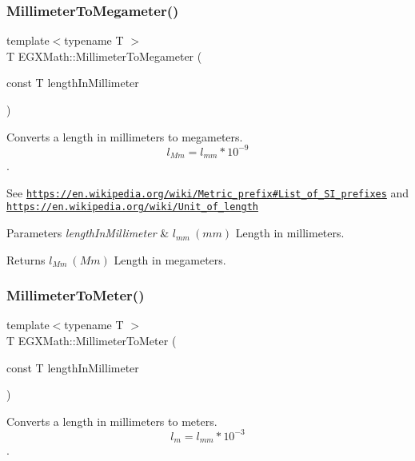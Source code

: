 \subsubsection{\texorpdfstring{Millimeter\+To\+Megameter()}{MillimeterToMegameter()}}
{\footnotesize\ttfamily template$<$typename T $>$ \\
T E\+G\+X\+Math\+::\+Millimeter\+To\+Megameter (\begin{DoxyParamCaption}\item[{const T}]{length\+In\+Millimeter }\end{DoxyParamCaption})}



Converts a length in millimeters to megameters. \[ l_{Mm}=l_{mm} * 10^{-9} \]. 

See \href{https://en.wikipedia.org/wiki/Metric_prefix#List_of_SI_prefixes}{\tt https\+://en.\+wikipedia.\+org/wiki/\+Metric\+\_\+prefix\#\+List\+\_\+of\+\_\+\+S\+I\+\_\+prefixes} and \href{https://en.wikipedia.org/wiki/Unit_of_length}{\tt https\+://en.\+wikipedia.\+org/wiki/\+Unit\+\_\+of\+\_\+length} 
\begin{DoxyParams}{Parameters}
{\em length\+In\+Millimeter} & $ l_{mm}\ (mm)$ Length in millimeters. \\
\hline
\end{DoxyParams}
\begin{DoxyReturn}{Returns}
$ l_{Mm}\ (Mm)$ Length in megameters. 
\end{DoxyReturn}
\mbox{\label{group___e_g_x_math-_conversions-_length_conversions-_s_i-_millimeter-_s_i_ga5bf52177bcfa3cce836b7cec4dcf5fb5}} 
\subsubsection{\texorpdfstring{Millimeter\+To\+Meter()}{MillimeterToMeter()}}
{\footnotesize\ttfamily template$<$typename T $>$ \\
T E\+G\+X\+Math\+::\+Millimeter\+To\+Meter (\begin{DoxyParamCaption}\item[{const T}]{length\+In\+Millimeter }\end{DoxyParamCaption})}



Converts a length in millimeters to meters. \[ l_{m}=l_{mm} * 10^{-3} \]. 


